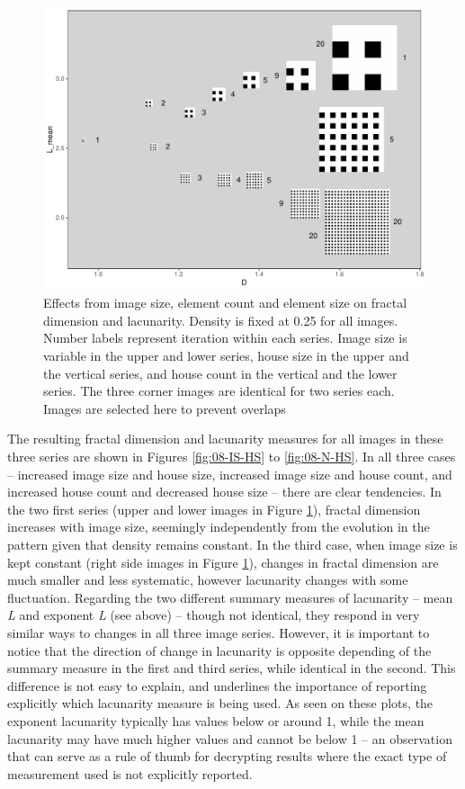 \documentclass[
  12pt,
]{book}
\begin{document}
\begin{figure}
\hypertarget{fig:08-N-im}{%
\centering
\includegraphics{Results/fig08_N_im.pdf}
\caption{Effects from image size, element count and element size on fractal dimension and lacunarity. Density is fixed at 0.25 for all images. Number labels represent iteration within each series. Image size is variable in the upper and lower series, house size in the upper and the vertical series, and house count in the vertical and the lower series. The three corner images are identical for two series each. Images are selected here to prevent overlaps}\label{fig:08-N-im}
}
\end{figure}

The resulting fractal dimension and lacunarity measures for all images in these three series are shown in Figures \ref{fig:08-IS-HS} to \ref{fig:08-N-HS}. In all three cases -- increased image size and house size, increased image size and house count, and increased house count and decreased house size -- there are clear tendencies. In the two first series (upper and lower images in Figure \ref{fig:08-N-im}), fractal dimension increases with image size, seemingly independently from the evolution in the pattern given that density remains constant. In the third case, when image size is kept constant (right side images in Figure \ref{fig:08-N-im}), changes in fractal dimension are much smaller and less systematic, however lacunarity changes with some fluctuation. Regarding the two different summary measures of lacunarity -- mean \emph{L} and exponent \emph{L} (see above) -- though not identical, they respond in very similar ways to changes in all three image series. However, it is important to notice that the direction of change in lacunarity is opposite depending of the summary measure in the first and third series, while identical in the second. This difference is not easy to explain, and underlines the importance of reporting explicitly which lacunarity measure is being used. As seen on these plots, the exponent lacunarity typically has values below or around 1, while the mean lacunarity may have much higher values and cannot be below 1 -- an observation that can serve as a rule of thumb for decrypting results where the exact type of measurement used is not explicitly reported.
\end{document}
